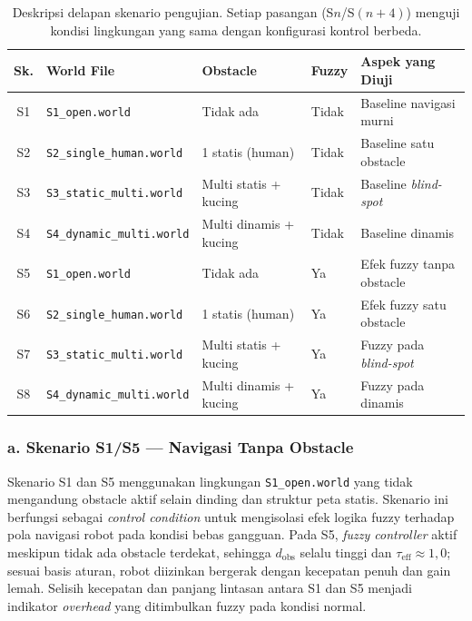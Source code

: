 \begin{table}[H]
\centering
\caption{Deskripsi delapan skenario pengujian. Setiap pasangan (S$n$/S$(n+4)$) menguji kondisi lingkungan yang sama dengan konfigurasi kontrol berbeda.}
\label{tab:skenario_pengujian}
\begin{tabular}{cllll}
\toprule
\textbf{Sk.} & \textbf{World File} & \textbf{Obstacle} &
\textbf{Fuzzy} & \textbf{Aspek yang Diuji} \\
\midrule
S1 & \texttt{S1\_open.world}           & Tidak ada         & Tidak & Baseline navigasi murni \\
S2 & \texttt{S2\_single\_human.world}  & 1 statis (human)  & Tidak & Baseline satu obstacle \\
S3 & \texttt{S3\_static\_multi.world}  & Multi statis + kucing & Tidak & Baseline \textit{blind-spot} \\
S4 & \texttt{S4\_dynamic\_multi.world} & Multi dinamis + kucing & Tidak & Baseline dinamis \\
\midrule
S5 & \texttt{S1\_open.world}           & Tidak ada         & Ya & Efek fuzzy tanpa obstacle \\
S6 & \texttt{S2\_single\_human.world}  & 1 statis (human)  & Ya & Efek fuzzy satu obstacle \\
S7 & \texttt{S3\_static\_multi.world}  & Multi statis + kucing & Ya & Fuzzy pada \textit{blind-spot} \\
S8 & \texttt{S4\_dynamic\_multi.world} & Multi dinamis + kucing & Ya & Fuzzy pada dinamis \\
\bottomrule
\end{tabular}
\end{table}

\subsubsection*{a. Skenario S1/S5 --- Navigasi Tanpa Obstacle}

Skenario S1 dan S5 menggunakan lingkungan \texttt{S1\_open.world} yang tidak mengandung obstacle aktif selain dinding dan struktur peta statis. Skenario ini berfungsi sebagai \textit{control condition} untuk mengisolasi efek logika fuzzy terhadap pola navigasi robot pada kondisi bebas gangguan. Pada S5, \textit{fuzzy controller} aktif meskipun tidak ada obstacle terdekat, sehingga $d_\text{obs}$ selalu tinggi dan $\tau_\text{eff} \approx 1{,}0$; sesuai basis aturan, robot diizinkan bergerak dengan kecepatan penuh dan gain lemah. Selisih kecepatan dan panjang lintasan antara S1 dan S5 menjadi indikator \textit{overhead} yang ditimbulkan fuzzy pada kondisi normal.

